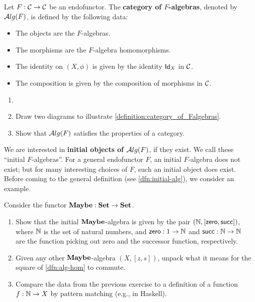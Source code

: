 \begin{dfn}\label{definition:category_of_Falgebras} Let $F:\CC\to \CC$ be an endofunctor. The \textbf{category of $F$-algebras}, denoted by $\ALG{F}$, is defined by the following data:
\begin{itemize}
\item The objects are the $F$-algebras.
\item The morphisms are the $F$-algebra homomorphisms.
\item The identity on $(X,\phi)$ is given by the identity $\Id[X]$ in $\CC$.
\item The composition is given by the composition of morphisms in $\CC$.
\end{itemize}
\end{dfn}

\begin{exer}
  \begin{enumerate}
  \item[]
  \item Draw two diagrams to illustrate \cref{definition:category_of_Falgebras}.
  \item Show that $\ALG{F}$ satisfies the properties of a category.
  \end{enumerate}
\end{exer}

We are interested in \textbf{initial objects of $\ALG{F}$}, if they exist.
We call these ``initial $F$-algebras''.
For a general endofunctor $F$, an initial $F$-algebra does not exist;
but for many interesting choices of $F$, such an initial object does exist.
Before coming to the general definition (see \cref{dfn:initial-alg}),
we consider an example.


\begin{exer}
  Consider the functor $\Maybe : \SET \to \SET$.
  \begin{enumerate}
  \item Show that the initial $\Maybe$-algebra is given by the pair $(\NN, [\Zero,\Succ])$, 
    where $\NN$ is the set of natural numbers, and $\Zero : 1 \to \NN$ and $\Succ : \NN\to\NN$ 
    are the function picking out zero and the successor function, respectively.
  \item Given any other $\Maybe$-algebra $(X,[z,s])$, unpack what it means for the square of \cref{dfn:alg-hom} to commute.
  \item Compare the data from the previous exercise to a definition of a function $f : \NN \to X$ by pattern matching (e.g., in Haskell).
  \end{enumerate}
\end{exer}


